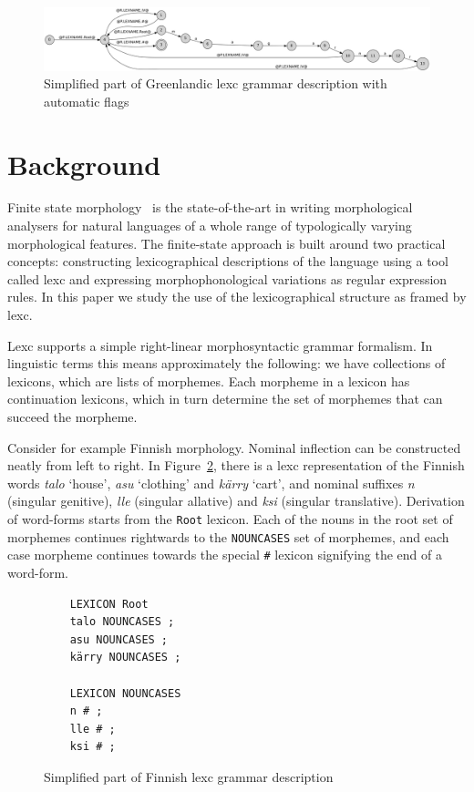 \documentclass[10pt, a4paper]{article}
\begin{document}
\begin{figure}
    \includegraphics[width=\textwidth]{gr.png}
     \caption{Simplified part of Greenlandic lexc grammar description with automatic flags
     \label{fig:lexc-gr-flag}}
\end{figure}

\section{Background}

\label{sec:background}

Finite state morphology~\cite{beesley2003finite} is the
state-of-the-art in writing morphological analysers for natural
languages of a whole range of typologically varying morphological
features. The finite-state approach is built around two practical
concepts: constructing lexicographical descriptions of the language
using a tool called lexc and expressing morphophonological
variations as regular expression rules. In this paper we study the use
of the lexicographical structure as framed by lexc. 

Lexc supports a simple right-linear morphosyntactic grammar formalism. In
linguistic terms this means approximately the following: we have
collections of lexicons, which are lists of morphemes. Each morpheme
in a lexicon has continuation lexicons, which in turn determine
the set of morphemes that can succeed the morpheme.

Consider for example Finnish morphology. Nominal inflection can be
constructed neatly from left to right. In Figure~\ref{fig:lexc-fin},
there is a lexc representation of the Finnish words \emph{talo} `house',
\emph{asu} `clothing' and \emph{kärry} `cart', and nominal suffixes
\emph{n} (singular genitive), \emph{lle} (singular allative) and
\emph{ksi} (singular translative). Derivation of word-forms starts
from the \texttt{Root} lexicon. Each of the nouns in the root set of morphemes
continues rightwards to the \texttt{NOUNCASES} set of morphemes, and each
case morpheme continues towards the special \texttt{\#} lexicon
signifying the end of a word-form.




\begin{figure}
    \centering
    \begin{verbatim}
    LEXICON Root
    talo NOUNCASES ;
    asu NOUNCASES ;
    kärry NOUNCASES ;

    LEXICON NOUNCASES
    n # ;
    lle # ;
    ksi # ;
    \end{verbatim}
    \caption{Simplified part of Finnish lexc grammar description
    \label{fig:lexc-fin}}
\end{figure}
\end{document}
